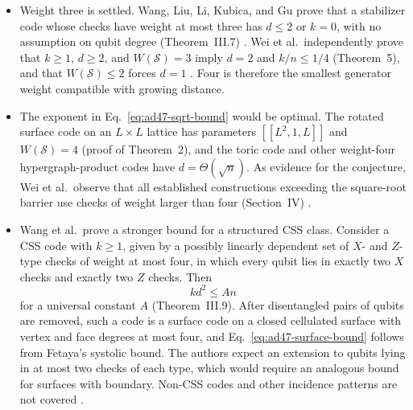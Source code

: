 \begin{itemize}
  \item Weight three is settled. Wang, Liu, Li, Kubica, and Gu prove that a stabilizer code whose checks have weight at most three has $d\leq2$ or $k=0$, with no assumption on qubit degree (Theorem~III.7) . Wei et al.\ independently prove that $k\geq1$, $d\geq2$, and $W(\mathcal S)=3$ imply $d=2$ and $k/n\leq1/4$ (Theorem~5), and that $W(\mathcal S)\leq2$ forces $d=1$ . Four is therefore the smallest generator weight compatible with growing distance.

  \item The exponent in Eq.~\eqref{eq:ad47-sqrt-bound} would be optimal. The rotated surface code on an $L\times L$ lattice has parameters $[[L^2,1,L]]$ and $W(\mathcal S)=4$ (proof of Theorem~2), and the toric code and other weight-four hypergraph-product codes have $d=\Theta(\sqrt n)$. As evidence for the conjecture, Wei et al.\ observe that all established constructions exceeding the square-root barrier use checks of weight larger than four (Section~IV) .

  \item Wang et al.\ prove a stronger bound for a structured CSS class. Consider a CSS code with $k\geq1$, given by a possibly linearly dependent set of $X$- and $Z$-type checks of weight at most four, in which every qubit lies in exactly two $X$ checks and exactly two $Z$ checks. Then
\begin{equation}
  kd^2\leq An
  \label{eq:ad47-surface-bound}
\end{equation}
for a universal constant $A$ (Theorem~III.9). After disentangled pairs of qubits are removed, such a code is a surface code on a closed cellulated surface with vertex and face degrees at most four, and Eq.~\eqref{eq:ad47-surface-bound} follows from Fetaya's systolic bound. The authors expect an extension to qubits lying in at most two checks of each type, which would require an analogous bound for surfaces with boundary. Non-CSS codes and other incidence patterns are not covered .


\end{itemize}
